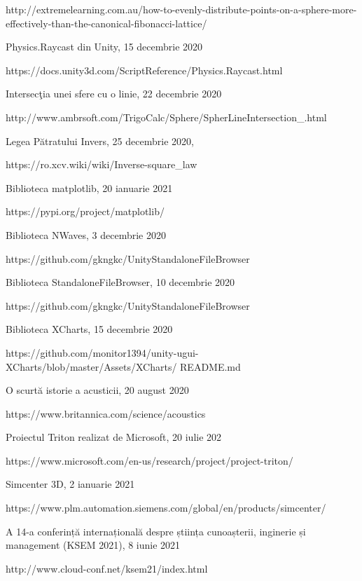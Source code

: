 \begin{thebibliography}{99.}
http://extremelearning.com.au/how-to-evenly-distribute-points-on-a-sphere-more-effectively-than-the-canonical-fibonacci-lattice/

 Physics.Raycast din Unity, 15 decembrie 2020

https://docs.unity3d.com/ScriptReference/Physics.Raycast.html 

 Intersec\c{t}ia unei sfere cu o linie, 22 decembrie 2020

http://www.ambrsoft.com/TrigoCalc/Sphere/SpherLineIntersection\_.html

 Legea Pătratului Invers, 25 decembrie 2020,

https://ro.xcv.wiki/wiki/Inverse-square\_law

 Biblioteca matplotlib, 20 ianuarie 2021

https://pypi.org/project/matplotlib/

 Biblioteca NWaves, 3 decembrie 2020

https://github.com/gkngkc/UnityStandaloneFileBrowser

 Biblioteca StandaloneFileBrowser, 10 decembrie 2020

https://github.com/gkngkc/UnityStandaloneFileBrowser

 Biblioteca XCharts, 15 decembrie 2020

https://github.com/monitor1394/unity-ugui-XCharts/blob/master/Assets/XCharts/ README.md

 O scurtă istorie a acusticii, 20 august 2020

https://www.britannica.com/science/acoustics

 Proiectul Triton realizat de Microsoft, 20 iulie 202

https://www.microsoft.com/en-us/research/project/project-triton/

 Simcenter 3D, 2 ianuarie 2021

https://www.plm.automation.siemens.com/global/en/products/simcenter/


 A 14-a conferință internațională despre știința cunoașterii, inginerie și management (KSEM 2021), 8 iunie 2021

http://www.cloud-conf.net/ksem21/index.html

\end{thebibliography}
